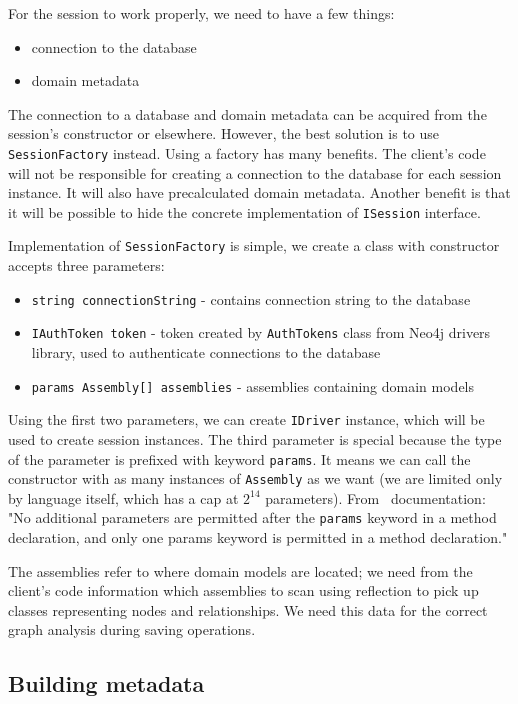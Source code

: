 For the session to work properly, we need to have a few things:

\begin{itemize}
    \item connection to the database
    \item domain metadata
\end{itemize}

The connection to a database and domain metadata can be acquired from the session's constructor or elsewhere. However,
the best solution is to use \texttt{SessionFactory} instead. Using a factory has many benefits. The client's code will not be responsible for
creating a connection to the database for each session instance. It will also have precalculated domain metadata. Another benefit is
that it will be possible to hide the concrete implementation of \texttt{ISession} interface.

Implementation of \texttt{SessionFactory} is simple, we create a class with constructor accepts three parameters:
\begin{itemize}
    \item {\texttt{string connectionString} - contains connection string to the database}
    \item {\texttt{IAuthToken token} - token created by \texttt{AuthTokens} class from Neo4j drivers library, used to authenticate connections to the database}
    \item {\texttt{params Assembly[] assemblies} - assemblies containing domain models}
\end{itemize}
Using the first two parameters, we can create \texttt{IDriver} instance, which will be used to create session instances. The third parameter is special
because the type of the parameter is prefixed with keyword \texttt{params}. It means we can call the constructor with as many instances of \texttt{Assembly} as we want
(we are limited only by language itself, which has a cap at $2^{14}$ parameters). From \CS\ documentation:
"No additional parameters are permitted after the \texttt{params} keyword in a method declaration, and only one params keyword is permitted in a method declaration." \cite{billwagner_params_nodate}

The assemblies refer to where domain models are located; we need from the client's code information which assemblies to scan using reflection to pick up classes
representing nodes and relationships. We need this data for the correct graph analysis during saving operations.

\subsection {Building metadata}

